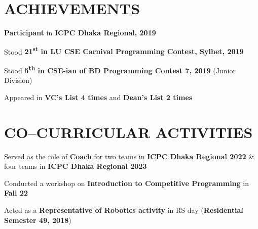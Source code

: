 \documentclass[letterpaper,10.5pt]{article}
\newcommand{\resumeSubHeadingListEnd}{\end{itemize}}
\begin{document}
\section{ACHIEVEMENTS}
\vspace{-2pt}
\begin{itemize}[leftmargin=0.2in, label={}, parsep=-2pt]
  \small{
  \item [\ding{112}]{
        \textbf{Participant} in \textbf{ICPC Dhaka Regional, 2019}}
  \item [\ding{112}]{Stood \textbf{21\textsuperscript{st} in LU CSE Carnival Programming Contest, Sylhet, 2019}}
  \item [\ding{112}]{Stood \textbf{5\textsuperscript{th} in CSE-ian of BD Programming Contest 7, 2019} (Junior Division)}
  \item [\ding{112}]{Appeared in \textbf{VC's List 4 times} and \textbf{Dean's List 2 times}}

        }
\end{itemize}
\vspace{-16pt}

\newpage
\section{CO--CURRICULAR ACTIVITIES}

\begin{itemize}[leftmargin=0.2in, label={}, parsep=-3pt]
  \small{
  \item [\ding{109}]{
        Served as the role of \textbf{Coach} for two teams in \textbf{ICPC Dhaka Regional 2022} \& four teams in \textbf{ICPC Dhaka Regional 2023}} \\
  \item [\ding{109}]{Conducted a workshop on \textbf{Introduction to Competitive Programming} in \textbf{Fall 22}}
  \item [\ding{109}]{Acted as a \textbf{Representative of Robotics activity} in RS day (\textbf{Residential Semester 49, 2018})}
        }
\end{itemize}
\vspace{-16pt}


\end{document}
